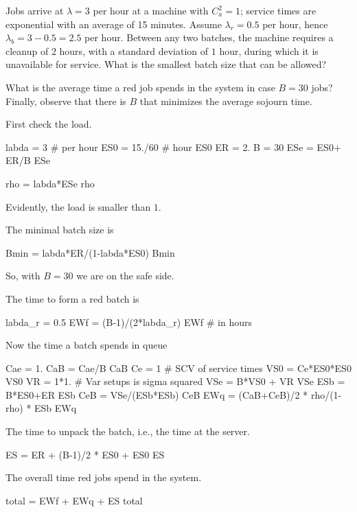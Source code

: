 \begin{exercise}
 Jobs arrive at $\lambda=3$ per hour at a machine with $C_a^2=1$; service times are exponential with an average of 15 minutes. Assume $\lambda_r = 0.5$ per hour, hence $\lambda_b = 3-0.5=2.5$ per hour. Between any two batches, the machine requires a cleanup of 2 hours, with a standard deviation of $1$ hour, during which it is unavailable for service.
 What is the smallest batch size that can be allowed?

 What is the average time a red job spends in the system in case $B=30$ jobs?
 Finally, observe that there is $B$ that minimizes the average sojourn time.
\begin{solution}
First check the load.
\begin{pyconsole}
labda = 3 # per hour
ES0 = 15./60 # hour
ES0
ER = 2.
B = 30
ESe = ES0+ ER/B
ESe

rho = labda*ESe
rho
\end{pyconsole}
Evidently, the load is smaller than $1$. 

The minimal batch size is
\begin{pyconsole}
Bmin = labda*ER/(1-labda*ES0)
Bmin
\end{pyconsole}
So, with $B=30$ we are on the safe side. 

The time to form a red batch is 
\begin{pyconsole}
labda_r = 0.5
EWf = (B-1)/(2*labda_r)
EWf # in hours
\end{pyconsole}

Now the time a batch spends in queue
\begin{pyconsole}
Cae = 1.
CaB = Cae/B
CaB
Ce = 1 # SCV of service times
VS0 = Ce*ES0*ES0
VS0
VR = 1*1. # Var setups is sigma squared
VSe = B*VS0 + VR
VSe
ESb = B*ES0+ER
ESb
CeB = VSe/(ESb*ESb)
CeB
EWq = (CaB+CeB)/2 * rho/(1-rho) * ESb
EWq
\end{pyconsole}

The time to unpack the batch, i.e., the time at the server. 
\begin{pyconsole}
ES = ER + (B-1)/2 * ES0 + ES0 
ES
\end{pyconsole}


The overall time red jobs spend in the system.
\begin{pyconsole}
total = EWf + EWq + ES
total
\end{pyconsole}

\end{solution}
\end{exercise}

